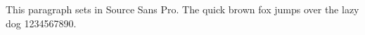 \documentclass{article}
\begin{document}
This paragraph sets in Source Sans Pro.
The quick brown fox jumps over the lazy dog 1234567890.
\end{document}
